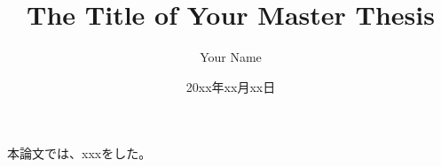 \documentclass[a4paper]{jarticle}
\title{{\Large The Title of Your Master Thesis}}
\author{Your Name}
\date{20xx年xx月xx日}
\begin{document}
\maketitle
\thispagestyle{empty}
\normalsize
本論文では、xxxをした\cite{Stolovitzky1998}。



\normalsize{
\printbibliography
}
\end{document}
